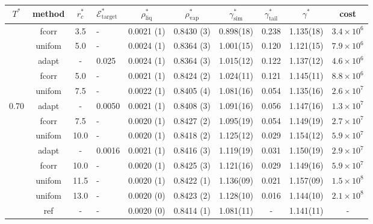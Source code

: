 \documentclass[aps,pre,preprint]{revtex4}
\begin{document}
\begin{table}
  \centering
  \begin{tabular*}{0.99\textwidth}{c|c|@{\extracolsep{\fill}}clcccccc}\hline\hline
    $T^\ast$ & \textrm{method} &$r^\ast_{c}$ & $\mathcal E^\ast_{\textrm{target}}$  & $\rho^\ast_{\textrm{liq}}$ & $\rho^\ast_{\textrm{vap}}$ & $\gamma^\ast_{\textrm{sim}}$ & $\gamma^\ast_{\textrm{tail}}$ & $\gamma^\ast$ & cost\\\hline
    & \textrm{fcorr}  & 3.5     & -       & 0.0021 (1) & 0.8430 (3) & 0.898(18) & 0.238 & 1.135(18) & $3.4\times 10^6$\\\cline{2-10}
    & \textrm{unifom} & 5.0     & -       & 0.0024 (1) & 0.8364 (3) & 1.001(15) & 0.120 & 1.121(15) & $7.9\times 10^6$\\
    & \textrm{adapt}  & -       & 0.025   & 0.0024 (1) & 0.8364 (3) & 1.015(12) & 0.122 & 1.137(12) & $4.6\times 10^6$\\
    & \textrm{fcorr}  & 5.0     & -       & 0.0021 (1) & 0.8424 (2) & 1.024(11) & 0.121 & 1.145(11) & $8.8\times 10^6$\\\cline{2-10}
    & \textrm{unifom} & 7.5     & -       & 0.0022 (1) & 0.8405 (4) & 1.081(16) & 0.054 & 1.135(16) & $2.6\times 10^7$\\
0.70& \textrm{adapt}  & -       & 0.0050  & 0.0021 (1) & 0.8408 (3) & 1.091(16) & 0.056 & 1.147(16) & $1.3\times 10^7$\\
    & \textrm{fcorr}  & 7.5     & -       & 0.0020 (1) & 0.8427 (2) & 1.095(19) & 0.054 & 1.149(19) & $2.7\times 10^7$\\\cline{2-10}
    & \textrm{unifom} & 10.0    & -       & 0.0020 (1) & 0.8418 (2) & 1.125(12) & 0.029 & 1.154(12) & $5.9\times 10^7$\\
    & \textrm{adapt}  & -       & 0.0016  & 0.0021 (1) & 0.8416 (3) & 1.119(19) & 0.031 & 1.150(19) & $2.9\times 10^7$\\
    & \textrm{fcorr}  & 10.0    & -       & 0.0020 (1) & 0.8425 (3) & 1.121(16) & 0.029 & 1.149(16) & $5.9\times 10^7$\\\cline{2-10}
    & \textrm{unifom} & 11.5    & -       & 0.0020 (1) & 0.8422 (1) & 1.136(09) & 0.021 & 1.157(09) & $1.5\times 10^8$\\
    & \textrm{unifom} & 13.0    & -       & 0.0020 (0) & 0.8423 (2) & 1.128(10) & 0.016 & 1.144(10) & $2.1\times 10^8$\\\cline{2-10}
    & \textrm{ref}    & -       & -       & 0.0020 (0) & 0.8414 (1) & 1.081(11) & -     & 1.141(11) & - \\    \hline\hline

\end{tabular*}
\end{table}
\end{document}
